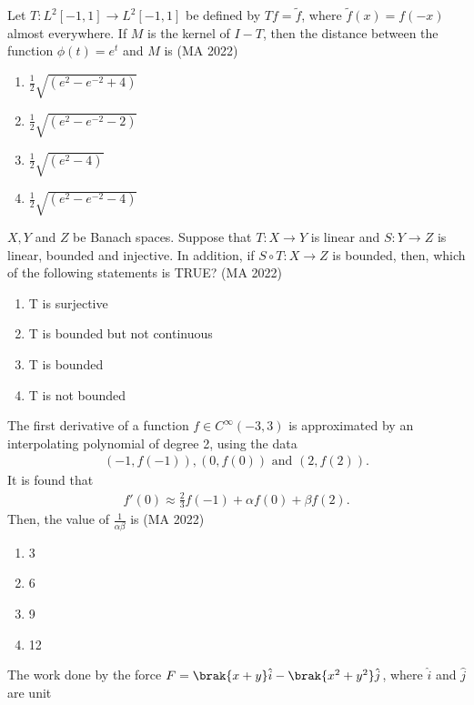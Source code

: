 \item Let $T:L^{2}[-1,1]\rightarrow L^{2}[-1,1]$ be defined by  $Tf = \tilde{f}$, where  $\tilde{f}(x) = f(-x)$ almost everywhere.
If $M$ is the kernel of $I-T$, then the distance between the function  $\phi(t) = e^t$  and $M$ is 
\hfill{(MA 2022)}
\begin{multicols}{2}
\begin{enumerate}
\item \quad $\frac{1}{2}\sqrt{(e^{2}-e^{-2}+4)}$
\item \quad $\frac{1}{2}\sqrt{(e^{2}-e^{-2}-2)}$ 
\item \quad $\frac{1}{2}\sqrt{(e^{2}-4)} $
\item \quad $\frac{1}{2}\sqrt{(e^{2}-e^{-2}-4)}$
\end{enumerate}
\end{multicols}
\item $X, Y $ and $Z$ be Banach spaces. Suppose that $T:X\rightarrow Y$ is linear and $S:Y \rightarrow Z$ is linear, bounded and injective. In addition, if $ S \circ T : X \rightarrow Z$ is bounded, then, which of the following statements is TRUE?
\hfill{(MA 2022)}
\begin{enumerate}
\item T is surjective
\item T is bounded but not continuous
\item T is bounded 
\item T is not bounded 
\end{enumerate}
\item The first derivative of a function $f \in C^{\infty}(-3, 3)$ is approximated by an interpolating polynomial of degree 2, using the data
\begin{align}
(-1, f(-1)),(0, f(0)) \text{ and } (2, f(2)).
\end{align}
It is found that
\begin{align}
f'(0) \approx \frac{2}{3}f(-1) + \alpha f(0) + \beta f(2).
\end{align}
Then, the value of $\frac{1}{\alpha \beta}$ is
\hfill{(MA 2022)}
\begin{multicols}{4}
\begin{enumerate}
\item 3 
\item 6
\item 9
\item 12
\end{enumerate}
\end{multicols}
\item The work done by the force $F = \brak{x+y}\hat{i} - \brak{x^2+y^2}\hat{j}$, where $\hat{i}$ and $\hat{j}$ are unit
